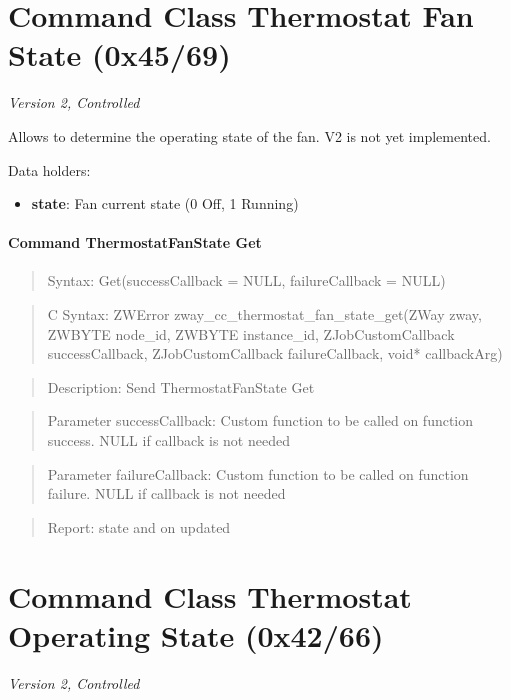 \section{Command Class Thermostat Fan State (0x45/69)}

\textit{Version 2, Controlled}
\newline

Allows to determine the operating state of the fan. V2 is not yet implemented.
\newline

\noindent
Data holders:

\begin{itemize}
\item \textbf{state}: Fan current state (0 Off, 1 Running)
\end{itemize}

\paragraph{Command ThermostatFanState Get}
\begin{quote}Syntax: Get(successCallback = NULL, failureCallback = NULL)\end{quote}
\begin{quote}C Syntax: ZWError zway\_cc\_thermostat\_fan\_state\_get(ZWay zway, ZWBYTE node\_id, ZWBYTE instance\_id, ZJobCustomCallback successCallback, ZJobCustomCallback failureCallback, void* callbackArg)\end{quote}
\begin{quote}Description: Send ThermostatFanState Get\end{quote}
\begin{quote}Parameter successCallback: Custom function to be called on function success. NULL if callback is not needed\end{quote}
\begin{quote}Parameter failureCallback: Custom function to be called on function failure. NULL if callback is not needed\end{quote}
\begin{quote}Report: state and on updated\end{quote}


\section{Command Class Thermostat Operating State (0x42/66)}

\textit{Version 2, Controlled}
\newline

